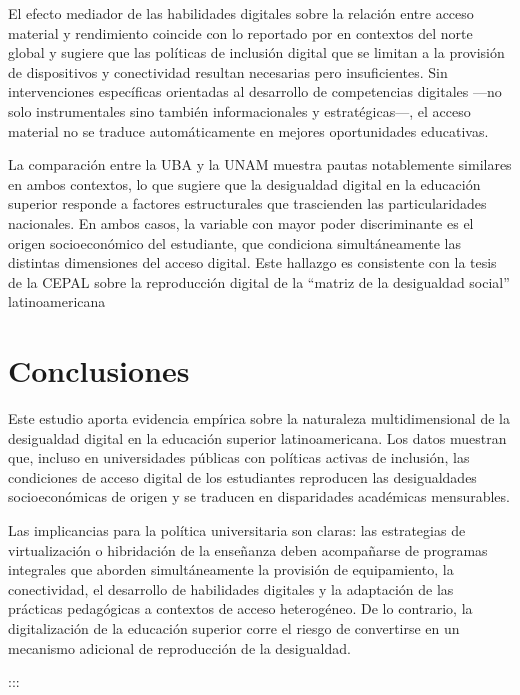 \documentclass{article}
\begin{document}
El efecto mediador de las habilidades digitales sobre la relación entre acceso material y rendimiento coincide con lo reportado por \autocite*{2565-HARGITTAI2002} en contextos del norte global y sugiere que las políticas de inclusión digital que se limitan a la provisión de dispositivos y conectividad resultan necesarias pero insuficientes. Sin intervenciones específicas orientadas al desarrollo de competencias digitales —no solo instrumentales sino también informacionales y estratégicas—, el acceso material no se traduce automáticamente en mejores oportunidades educativas.

La comparación entre la UBA y la UNAM muestra pautas notablemente similares en ambos contextos, lo que sugiere que la desigualdad digital en la educación superior responde a factores estructurales que trascienden las particularidades nacionales. En ambos casos, la variable con mayor poder discriminante es el origen socioeconómico del estudiante, que condiciona simultáneamente las distintas dimensiones del acceso digital. Este hallazgo es consistente con la tesis de la CEPAL sobre la reproducción digital de la “matriz de la desigualdad social” latinoamericana \autocite{2566-CEPAL2021}


\section{Conclusiones}
Este estudio aporta evidencia empírica sobre la naturaleza multidimensional de la desigualdad digital en la educación superior latinoamericana. Los datos muestran que, incluso en universidades públicas con políticas activas de inclusión, las condiciones de acceso digital de los estudiantes reproducen las desigualdades socioeconómicas de origen y se traducen en disparidades académicas mensurables.

Las implicancias para la política universitaria son claras: las estrategias de virtualización o hibridación de la enseñanza deben acompañarse de programas integrales que aborden simultáneamente la provisión de equipamiento, la conectividad, el desarrollo de habilidades digitales y la adaptación de las prácticas pedagógicas a contextos de acceso heterogéneo. De lo contrario, la digitalización de la educación superior corre el riesgo de convertirse en un mecanismo adicional de reproducción de la desigualdad.

:::



\printbibliography
\end{document}
